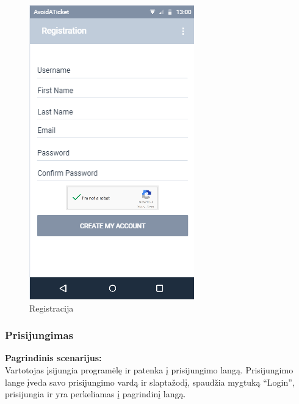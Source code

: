 \documentclass{VUMIFPSkursinis}
\begin{document}
	\begin{figure}[H]
				\centering
				\includegraphics[scale=0.55]{img/mockup_registration}
				\caption{Registracija}
				\label{img:registracija}
			\end{figure}

\subsubsection{Prisijungimas}
	\textbf{Pagrindinis scenarijus:}\\
	Vartotojas įsijungia programėlę ir patenka į prisijungimo langą. Prisijungimo lange įveda savo prisijungimo vardą ir slaptažodį, 
	spaudžia mygtuką “Login”, prisijungia ir yra perkeliamas į pagrindinį langą.
	
\end{document}
